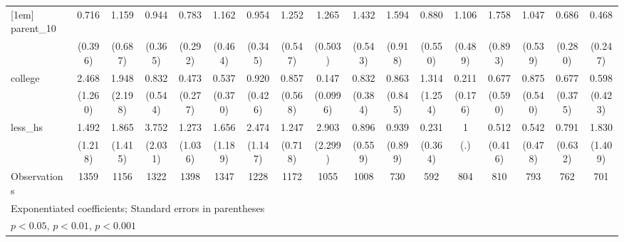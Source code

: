 {\begin{tabular}{l*{16}{c}}
[1em]
parent\_10           &       0.716         &       1.159         &       0.944         &       0.783         &       1.162         &       0.954         &       1.252         &       1.265         &       1.432         &       1.594         &       0.880         &       1.106         &       1.758         &       1.047         &       0.686         &       0.468         \\
                    &     (0.396)         &     (0.687)         &     (0.365)         &     (0.292)         &     (0.464)         &     (0.345)         &     (0.547)         &     (0.503)         &     (0.543)         &     (0.918)         &     (0.550)         &     (0.489)         &     (0.893)         &     (0.539)         &     (0.280)         &     (0.247)         \\
[1em]
college             &       2.468         &       1.948         &       0.832         &       0.473         &       0.537         &       0.920         &       0.857         &       0.147\sym{**} &       0.832         &       0.863         &       1.314         &       0.211         &       0.677         &       0.875         &       0.677         &       0.598         \\
                    &     (1.260)         &     (2.198)         &     (0.544)         &     (0.277)         &     (0.370)         &     (0.426)         &     (0.568)         &    (0.0996)         &     (0.384)         &     (0.845)         &     (1.254)         &     (0.176)         &     (0.590)         &     (0.540)         &     (0.375)         &     (0.423)         \\
[1em]
less\_hs             &       1.492         &       1.865         &       3.752\sym{*}  &       1.273         &       1.656         &       2.474         &       1.247         &       2.903         &       0.896         &       0.939         &       0.231         &           1         &       0.512         &       0.542         &       0.791         &       1.830         \\
                    &     (1.218)         &     (1.415)         &     (2.031)         &     (1.036)         &     (1.189)         &     (1.147)         &     (0.718)         &     (2.299)         &     (0.559)         &     (0.899)         &     (0.364)         &         (.)         &     (0.416)         &     (0.478)         &     (0.632)         &     (1.409)         \\
\hline
Observations        &        1359         &        1156         &        1322         &        1398         &        1347         &        1228         &        1172         &        1055         &        1008         &         730         &         592         &         804         &         810         &         793         &         762         &         701         \\
\hline\hline
\multicolumn{17}{l}{\footnotesize Exponentiated coefficients; Standard errors in parentheses}\\
\multicolumn{17}{l}{\footnotesize \sym{*} \(p<0.05\), \sym{**} \(p<0.01\), \sym{***} \(p<0.001\)}\\
\end{tabular}
}
